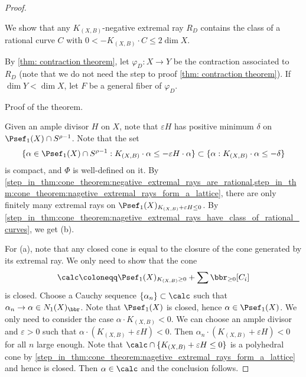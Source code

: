 \begin{proof}
        \begin{step}\label{step_in_thm:cone_theorem:nagetive_extremal_rays_have_class_of_rational_curves}
            We show that any \(K_{(X,B)}\)-negative extremal ray \(R_D\) contains the class of a rational curve \(C\) with \(0 < -K_{(X,B)} \cdot C \leq 2 \dim X\).
        \end{step}
        By \cref{thm: contraction theorem}, let \(\varphi_D: X \to Y\) be the contraction associated to \(R_D\) (note that we do not need the step to proof \cref{thm: contraction theorem}).
        If \(\dim Y < \dim X\), let \(F\) be a general fiber of \(\varphi_D\).


        \begin{step}\label{step_in_thm:cone_theorem:finish_the_proof}
            Proof of the theorem.
        \end{step}
        Given an ample divisor \(H\) on \(X\), note that \(\varepsilon H\) has positive minimum \(\delta\) on \(\Psef_1(X) \cap S^{\rho-1}\).
        Note that the set 
        \[ \{\alpha \in \Psef_1(X)\cap S^{\rho-1} : K_{(X,B)}\cdot \alpha \leq -\varepsilon H\cdot \alpha\} \subset \{\alpha: K_{(X,B)}\cdot \alpha \leq -\delta\} \] 
        is compact, and \(\Phi\) is well-defined on it.
        By \cref{step_in_thm:cone_theorem:negative_extremal_rays_are_rational,step_in_thm:cone_theorem:nagetive_extremal_rays_form_a_lattice}, 
        there are only finitely many extremal rays on \(\Psef_1(X)_{K_{(X,B)}+\varepsilon H \leq 0}\).
        By \cref{step_in_thm:cone_theorem:nagetive_extremal_rays_have_class_of_rational_curves}, we get (b).

        For (a), note that any closed cone is equal to the closure of the cone generated by its extremal ray.
        We only need to show that the cone
        \[ \calc\coloneqq \Psef_1(X)_{K_{(X,B)} \geq 0} + \sum \bbr_{\geq 0}[C_i] \]
        is closed.
        Choose a Cauchy sequence \(\{\alpha_n\} \subset \calc\) such that \(\alpha_n \to \alpha \in N_1(X)_\bbr\).
        Note that \(\Psef_1(X)\) is closed, hence \(\alpha \in \Psef_1(X)\).
        We only need to consider the case \(\alpha \cdot K_{(X,B)} < 0\).
        We can choose an ample divisor and \(\varepsilon > 0\) such that \(\alpha \cdot (K_{(X,B)}+\varepsilon H) < 0\).
        Then \(\alpha_n \cdot (K_{(X,B)}+\varepsilon H) < 0\) for all \(n\) large enough.
        Note that \(\calc \cap \{K_{(X,B)}+\varepsilon H \leq 0\}\) is a polyhedral cone by \cref{step_in_thm:cone_theorem:nagetive_extremal_rays_form_a_lattice} and hence is closed.
        Then \(\alpha \in \calc\) and the conclusion follows.
    \end{proof}
